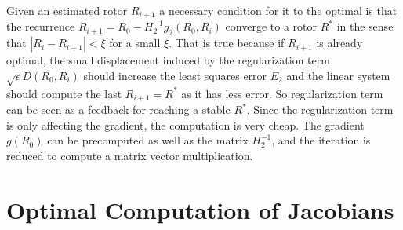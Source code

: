 \documentclass{birkjour}
\numberwithin{equation}{section}
\begin{document}
Given an estimated rotor $R_{i+1}$ a necessary condition for it to the optimal is that the recurrence $R_{i+1} = R_0 - H_2^{-1} g_2(R_0,R_i)$ converge to a rotor $R^*$ in the sense that $|R_i - R_{i+1}| < \xi$ for a small $\xi$. That is true because if $R_{i+1}$ is already optimal, the small displacement induced by the regularization term $\sqrt{\epsilon} D(R_0,R_i)$ should increase the least squares error $E_2$ and the linear system should compute the last $R_{i+1} = R^*$ as it has less error. So regularization term can be seen as a feedback for reaching a stable $R^*$. Since the regularization term is only affecting the gradient, the computation is very cheap. The gradient $g(R_0)$ can be precomputed as well as the matrix $H_2^{-1}$, and the iteration is reduced to compute a matrix vector multiplication.

\section{Optimal Computation of Jacobians}
\end{document}
